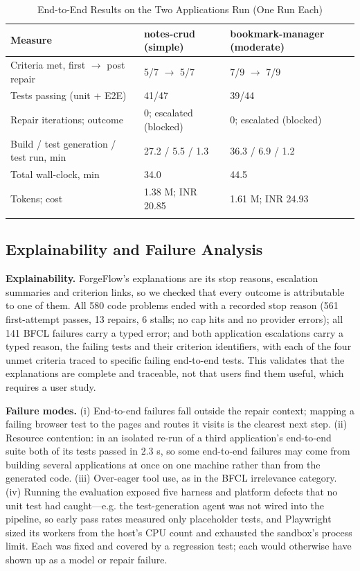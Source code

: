 \documentclass[pdflatex,sn-mathphys-num]{sn-jnl}%
\theoremstyle{thmstyleone}%
\theoremstyle{thmstyletwo}%
\theoremstyle{thmstylethree}%
\begin{document}
\begin{table}[t]
\caption{End-to-End Results on the Two Applications Run (One Run Each)}\label{tab6}%
\small
\begin{tabular*}{\textwidth}{@{\extracolsep\fill}p{4.2cm}p{3.4cm}p{3.4cm}@{}}
\toprule
\raggedright{}\textbf{Measure} & \centering{}\textbf{notes-crud (simple)} & \centering{}\textbf{bookmark-manager (moderate)}\tabularnewline
\midrule
\raggedright{}Criteria met, first $\rightarrow$ post repair & \centering{}5/7 $\rightarrow$ 5/7 & \centering{}7/9 $\rightarrow$ 7/9\tabularnewline
\raggedright{}Tests passing (unit + E2E) & \centering{}41/47 & \centering{}39/44\tabularnewline
\raggedright{}Repair iterations; outcome & \centering{}0; escalated (blocked) & \centering{}0; escalated (blocked)\tabularnewline
\raggedright{}Build / test generation / test run, min & \centering{}27.2 / 5.5 / 1.3 & \centering{}36.3 / 6.9 / 1.2\tabularnewline
\raggedright{}Total wall-clock, min & \centering{}34.0 & \centering{}44.5\tabularnewline
\raggedright{}Tokens; cost & \centering{}1.38 M; INR 20.85 & \centering{}1.61 M; INR 24.93\tabularnewline
\botrule
\end{tabular*}
\end{table}

\subsection{Explainability and Failure Analysis}\label{sec8.6}

\textbf{Explainability.} ForgeFlow's explanations are its stop reasons, escalation summaries and criterion links, so we checked that every outcome is attributable to one of them. All 580 code problems ended with a recorded stop reason (561 first-attempt passes, 13 repairs, 6 stalls; no cap hits and no provider errors); all 141 BFCL failures carry a typed error; and both application escalations carry a typed reason, the failing tests and their criterion identifiers, with each of the four unmet criteria traced to specific failing end-to-end tests. This validates that the explanations are complete and traceable, not that users find them useful, which requires a user study.

\textbf{Failure modes.} (i) End-to-end failures fall outside the repair context; mapping a failing browser test to the pages and routes it visits is the clearest next step. (ii) Resource contention: in an isolated re-run of a third application's end-to-end suite both of its tests passed in 2.3 s, so some end-to-end failures may come from building several applications at once on one machine rather than from the generated code. (iii) Over-eager tool use, as in the BFCL irrelevance category. (iv) Running the evaluation exposed five harness and platform defects that no unit test had caught---e.g. the test-generation agent was not wired into the pipeline, so early pass rates measured only placeholder tests, and Playwright sized its workers from the host's CPU count and exhausted the sandbox's process limit. Each was fixed and covered by a regression test; each would otherwise have shown up as a model or repair failure.
\end{document}
